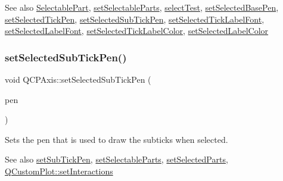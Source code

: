 \begin{DoxySeeAlso}{See also}
\mbox{\hyperlink{class_q_c_p_axis_abee4c7a54c468b1385dfce2c898b115f}{Selectable\+Part}}, \mbox{\hyperlink{class_q_c_p_axis_a513f9b9e326c505d9bec54880031b085}{set\+Selectable\+Parts}}, \mbox{\hyperlink{class_q_c_p_axis_a63b7103c57fe9acfbce164334ea837f8}{select\+Test}}, \mbox{\hyperlink{class_q_c_p_axis_aeb917a909215605b95ef2be843de1ee8}{set\+Selected\+Base\+Pen}}, \mbox{\hyperlink{class_q_c_p_axis_a8360502685eb782edbf04019c9345cdc}{set\+Selected\+Tick\+Pen}}, \mbox{\hyperlink{class_q_c_p_axis_a2a00a7166600155eac26843132eb9576}{set\+Selected\+Sub\+Tick\+Pen}}, \mbox{\hyperlink{class_q_c_p_axis_a845ccb560b7bc5281098a5be494145f6}{set\+Selected\+Tick\+Label\+Font}}, \mbox{\hyperlink{class_q_c_p_axis_a02ec2a75d4d8401eaab834fbc6803d30}{set\+Selected\+Label\+Font}}, \mbox{\hyperlink{class_q_c_p_axis_a9bdbf5e63ab15187f3a1de9440129227}{set\+Selected\+Tick\+Label\+Color}}, \mbox{\hyperlink{class_q_c_p_axis_a5d502dec597c634f491fdd73d151c72d}{set\+Selected\+Label\+Color}} 
\end{DoxySeeAlso}
\mbox{\label{class_q_c_p_axis_a2a00a7166600155eac26843132eb9576}} 
\subsubsection{\texorpdfstring{setSelectedSubTickPen()}{setSelectedSubTickPen()}}
{\footnotesize\ttfamily void Q\+C\+P\+Axis\+::set\+Selected\+Sub\+Tick\+Pen (\begin{DoxyParamCaption}\item[{const Q\+Pen \&}]{pen }\end{DoxyParamCaption})}

Sets the pen that is used to draw the subticks when selected.

\begin{DoxySeeAlso}{See also}
\mbox{\hyperlink{class_q_c_p_axis_aede4028ae7516bd51a60618a8233f9cf}{set\+Sub\+Tick\+Pen}}, \mbox{\hyperlink{class_q_c_p_axis_a513f9b9e326c505d9bec54880031b085}{set\+Selectable\+Parts}}, \mbox{\hyperlink{class_q_c_p_axis_ab9d7a69277dcbed9119b3c1f25ca19c3}{set\+Selected\+Parts}}, \mbox{\hyperlink{class_q_custom_plot_a5ee1e2f6ae27419deca53e75907c27e5}{Q\+Custom\+Plot\+::set\+Interactions}} 
\end{DoxySeeAlso}
\mbox{\label{class_q_c_p_axis_a9bdbf5e63ab15187f3a1de9440129227}} 
